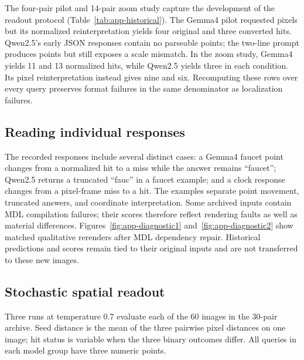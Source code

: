 The four-pair pilot and 14-pair zoom study capture the development of the
readout protocol (Table~\ref{tab:app-historical}). The Gemma4 pilot requested
pixels but its normalized reinterpretation yields four original and three
converted hits. Qwen2.5's early JSON responses contain no parseable points;
the two-line prompt produces points but still exposes a scale mismatch.
In the zoom study, Gemma4 yields 11 and 13 normalized hits, while Qwen2.5 yields
three in each condition. Its pixel reinterpretation instead gives nine and
six. Recomputing these rows over every query preserves format failures in the
same denominator as localization failures.

\begin{table}[htbp]
\centering\small
\setlength{\tabcolsep}{4pt}

\caption{Earlier pilot and zoom runs, rescored from saved predictions with
fixed denominators. Entries separated by a slash are Original/Converted
counts. The Gemma4 pilot requested pixels; all other rows requested normalized
0--1000. ``Other frame'' applies the alternative interpretation uniformly.}
\label{tab:app-historical}
\end{table}

\subsection{Reading individual responses}
The recorded responses include several distinct cases:
a Gemma4 faucet point changes from a normalized hit to a miss while the answer
remains ``faucet''; Qwen2.5 returns a truncated ``fauc'' in a faucet example;
and a clock response changes from a pixel-frame miss to a hit. The examples
separate point movement, truncated answers, and coordinate interpretation.
Some archived inputs contain MDL compilation failures; their scores therefore
reflect rendering faults as well as material differences.
Figures~\ref{fig:app-diagnostic1} and~\ref{fig:app-diagnostic2} show matched
qualitative rerenders after MDL dependency repair. Historical predictions and
scores remain tied to their original inputs and are not transferred to these
new images.

\subsection{Stochastic spatial readout}
Three runs at temperature 0.7 evaluate each of the 60 images in the 30-pair
archive. Seed distance is the mean of the three pairwise pixel distances on
one image; hit status is variable when the three binary outcomes differ.
All queries in each model group have three numeric points.

